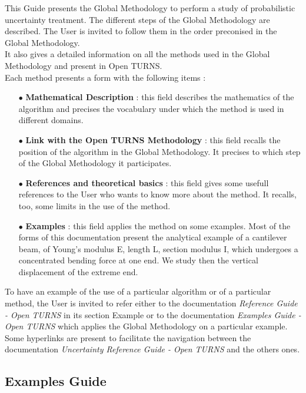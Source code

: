 \documentclass[11pt]{article}
\begin{document}
This Guide presents the Global Methodology to perform a study of probabilistic uncertainty treatment. The different steps of the Global Methodology are described. The User is invited to follow them in the order preconised in the Global Methodology.\\

It also gives a detailed information on all the methods used in the Global Methodology and present in Open TURNS.\\

Each method presents a form with the following items :
\begin{itemize}
\item[$\bullet$] {\bf Mathematical Description} : this field describes the mathematics of the algorithm and precises the vocabulary under which the method is used in different domains.
\item[$\bullet$] {\bf Link with the Open TURNS Methodology} : this field recalls the position of the algorithm in the Global Methodology. It precises to which step of the Global Methodology it participates.
\item[$\bullet$] {\bf References and theoretical basics} : this field gives some usefull references to the User who wants to know more about the method. It recalls, too, some limits in the use of the method.
\item[$\bullet$] {\bf Examples} : this field applies the method on some examples. Most of the forms of this documentation present the analytical example of a cantilever beam, of Young's modulus E, length L, section modulus I, which undergoes a concentrated bending force at one end. We study then the vertical displacement of the extreme end.
\end{itemize}

To have an example of the use of a particular algorithm or of a particular method, the User is invited to refer either to the documentation {\itshape Reference Guide - Open TURNS}  in its section {Example} or to the documentation {\itshape Examples Guide - Open TURNS} which applies the Global Methodology on a particular example.\\

Some hyperlinks are present to facilitate the navigation between the documentation {\itshape Uncertainty Reference Guide - Open TURNS} and the others ones.


\subsection{Examples Guide}
\end{document}
